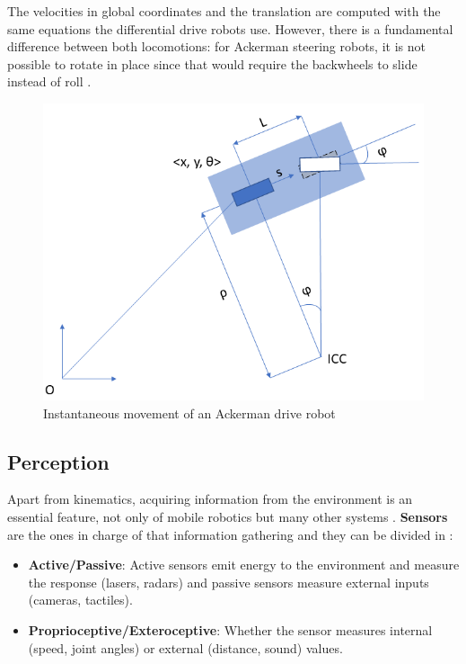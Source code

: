 The velocities in global coordinates and the translation are computed with the same equations the differential drive robots use. However, there is a fundamental difference between both locomotions: for Ackerman steering robots, it is not possible to rotate in place since that would require the backwheels to slide instead of roll .

\begin{figure}[htb]
  \centering
  \includegraphics[width=.9\linewidth]{pictures/02/ackeq}
  \caption{Instantaneous movement of an Ackerman drive robot}
  \label{fig:ackeq}
\end{figure}

\subsection{Perception} \label{sub:perception}

Apart from kinematics, acquiring information from the environment is an essential feature, not only of mobile robotics but many other systems . \textbf{Sensors} are the ones in charge of that information gathering and they can be divided in :
\begin{itemize}
  \item \textbf{Active/Passive}: Active sensors emit energy to the environment and measure the response (lasers, radars) and passive sensors measure external inputs (cameras, tactiles).

  \item \textbf{Proprioceptive/Exteroceptive}: Whether the sensor measures internal (speed, joint angles) or external (distance, sound) values.
\end{itemize} 

